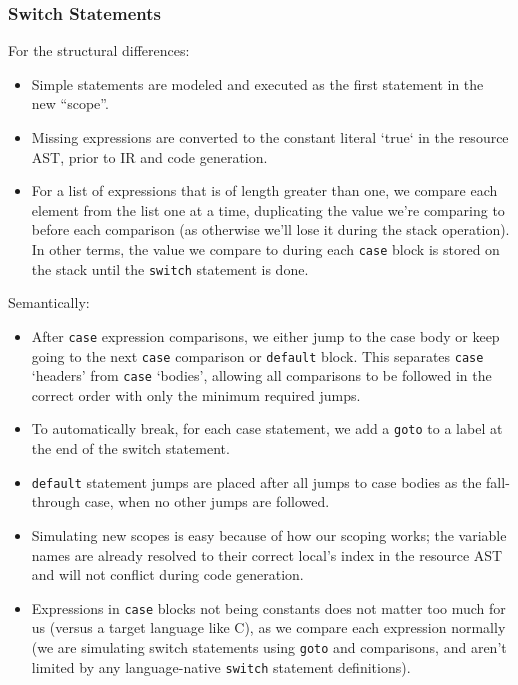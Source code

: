 \documentclass[11pt]{article}
\begin{document}
\subsubsection{Switch Statements}
For the structural differences:
\begin{itemize}
\item Simple statements are modeled and executed as the first
  statement in the new ``scope''.
\item Missing expressions are converted to the constant literal
  `true` in the resource AST, prior to IR and code generation.
\item For a list of expressions that is of length greater than one, we
  compare each element from the list one at a time, duplicating
  the value we're comparing to before each comparison (as otherwise
  we'll lose it during the stack operation). In other terms, the value
  we compare to during each \texttt{case} block is stored on the stack
  until the \texttt{switch} statement is done.
\end{itemize}

\noindent Semantically:

\begin{itemize}
\item After \texttt{case} expression comparisons, we either jump
  to the case body or keep going to the next \texttt{case} comparison
  or \texttt{default} block. This separates \texttt{case} `headers'
  from \texttt{case} `bodies', allowing all comparisons to be followed
  in the correct order with only the minimum required jumps.
\item To automatically break, for each case statement, we add a
  \texttt{goto} to a label at the end of the switch statement.
\item \texttt{default} statement jumps are placed after all
  jumps to case bodies as the fall-through case, when no other jumps
  are followed.
\item Simulating new scopes is easy because of how our scoping works;
  the variable names are already resolved to their correct local's
  index in the resource AST and will not conflict during code generation.
\item Expressions in \texttt{case} blocks not being constants does not
  matter too much for us (versus a target language like C), as we compare
  each expression normally (we are simulating switch statements using
  \texttt{goto} and comparisons, and aren't limited by any language-native
  \texttt{switch} statement definitions).
\end{itemize}
\end{document}
